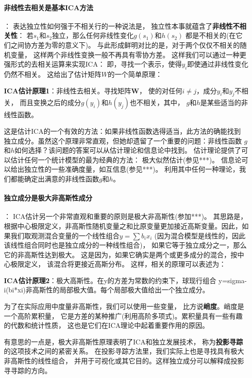 \paragraph*{非线性去相关是基本ICA方法}：
表达独立性如何强于不相关行的一种说法是，
独立性本事就蕴含了\textbf{非线性不相关性}：
若$s_1$和$s_2$独立，那么任何非线性变化$g(s_1)$和$h(s_2)$
都是不相关的(在它们之间协方差为零的意义下)。
与此形成鲜明对比的是，对于两个仅仅不相关的随机变量，
这样两个非线性变换一般不再具有零协方差。
这样我们可以通过一种更强形式的去相关运算来实现ICA：
即，寻找一个表示，使得$y_i$即使通过非线性变化仍然不相关。
这给出了估计矩阵$W$的一个简单原理：

\textbf{ICA估计原理1}：非线性去相关。寻找矩阵$\bm{W}$，
使的对任何$i \ne j$，成分$y_i$和$y_j$不相关，
而且变换之后的成分$g(y_i)$和$h(y_j)$也不相关，其中，
$g$和$h$是某些适当的非线性函数。

	这是估计ICA的一个有效的方法：如果非线性函数选得适当，此方法的确能找到
独立成分。虽然这个原理非常直观，但她却遗留了一个重要的问题：非线性函数
$g$和$h$如何选择？该问题的答案可以从估计理论和信息论中找到。
估计理论提供了可以估计任何一个统计模型的最为经典的方法：
极大似然估计(参见***)。
信息论可以给出独立性的一些准确度量，如互信息(参见***)。
利用其中任何一种理论，我们都能确定出满意的非线性函数$g$和$h$。
    
\paragraph*{独立成分是极大非高斯性成分}：
ICA估计另一个非常直观和重要的原则是极大非高斯性(参加***)。
其思路是，根据中心极限定义，非高斯性随机变量之和比原变量更加接近高斯变量。因此，如果我们取观测混合变量的一个线性组合$y=\sum b_i x_i$
(因为混合模型是线性的，因此该线性组合同时也是独立成分的一种线性组合)，
如果它等于独立成分之一，那么它的非高斯性达到极大。
这是因为，如果它确实是两个或更多成分的混合，按中心极限定义，
该混合将更接近高斯分布。
    这样，相关的原理可以表述为：

	\textbf{ICA估计原理2}：极大高斯性。在y的方差为常数的约束下，球现行组合
	y=sigma-i(bi*xi)非高斯性的局部极大值。每个局部极大值给出一个独立成分。
    
	为了在实际应用中度量非高斯性，我们可以使用一些变量，
比方说\textbf{峭度}。峭度是一个高阶累积量，
它是方差的某种推广(利用高阶多项式)。累积量具有一些有趣的代数和统计性质，
这也是它们在ICA理论中起着重要作用的原因。
    
有意思的一点是，极大非高斯性原理表明了ICA和独立发展技术，
称为\textbf{投影寻踪}的这项技术之间的紧密关系。
在投影寻踪方法里，我们实际上也是寻找具有极大非高斯性的线性组合，
并用于可视化或其它目的。这样独立成分可以解释成投影寻寻踪的方向。
    
